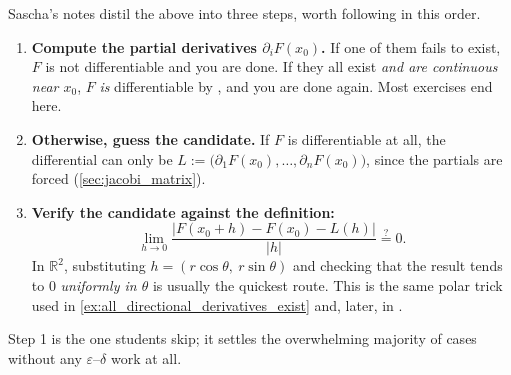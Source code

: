 \begin{remark}
\label{rem:differentiability_recipe}
Sascha's notes distil the above into three steps, worth following in this order.
\begin{enumerate}[label=\textbf{(\alph*)}]
  \item \textbf{Compute the partial derivatives $\partial_iF(x_0)$.} If one of them fails to
    exist, $F$ is not differentiable and you are done. If they all exist \emph{and are
    continuous near $x_0$}, $F$ \emph{is} differentiable by
    , and you are done again. Most exercises
    end here.
  \item \textbf{Otherwise, guess the candidate.} If $F$ is differentiable at all, the differential
    can only be $L := \big(\partial_1F(x_0),\dots,\partial_nF(x_0)\big)$, since the partials are
    forced (\cref{sec:jacobi_matrix}).
  \item \textbf{Verify the candidate against the definition:}
    \[\lim_{h\to0}\frac{\big|F(x_0+h)-F(x_0)-L(h)\big|}{|h|} \overset{?}{=} 0.\]
    In $\mathbb{R}^2$, substituting $h = (r\cos\theta,\ r\sin\theta)$ and checking that the
    result tends to $0$ \emph{uniformly in $\theta$} is usually the quickest route. This is the
    same polar trick used in \cref{ex:all_directional_derivatives_exist} and, later, in
    .
\end{enumerate}
Step 1 is the one students skip; it settles the overwhelming majority of cases without any
$\varepsilon$--$\delta$ work at all.
\end{remark}

